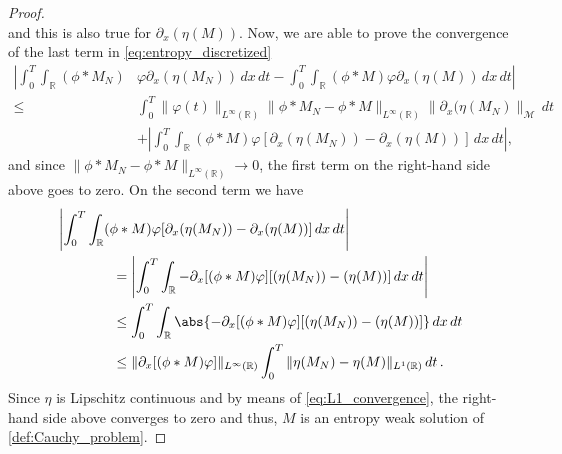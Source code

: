 \documentclass[11pt,a4paper,oneside]{amsart}
\def\green#1{\textcolor{green!70!black}{#1}}
\newcommand\R{\mathbb{R}}
\newcommand{\MM}{\mathcal{M}}
\begin{document}
\begin{proof}
$$        $$
        and this is also true for $\partial_x(\eta(M))$. Now, we are able to prove the convergence of the last term 
        in %
        \eqref{eq:entropy_discretized}%
        \begin{align*}
            \left|\int_0^T\int_\R(\phi\ast M_N)\right.&\left.\varphi\partial_x(\eta(M_N))\,dx\,dt-\int_0^T\int_\R (\phi\ast M)\varphi\partial_x(\eta(M))\,dx\,dt\right|\\
            \leq & \int_0^T \|\varphi(t)\|_{L^\infty(\R)}\|\phi\ast M_N-\phi\ast M\|_{L^\infty(\R)}\|\partial_x(\eta(M_N)\|_\MM\,dt \\
            &+\left| \int_0^T\int_\R (\phi\ast M)\varphi[\partial_x(\eta(M_N))-\partial_x(\eta(M))]\,dx\,dt\right|,
        \end{align*}
and since $\|\phi\ast M_N-\phi\ast M\|_{L^\infty(\R)}\to0$, the first term on the right-hand side above goes to zero.  
On the second term we have
        \begin{align*}
            &\left| \int_0^T\int_\R (\phi\ast M)\varphi[\partial_x(\eta(M_N))-\partial_x(\eta(M))]\,dx\,dt \right|\\
            &\qquad\qquad  = \left| \int_0^T\int_\R -\partial_x[(\phi\ast M)\varphi][(\eta(M_N))-(\eta(M))]\,dx\,dt \right|\\ 
            &\qquad\qquad  \leq \int_0^T\int_\R\abs{-\partial_x[(\phi\ast M)\varphi][(\eta(M_N))-(\eta(M))]}\,dx\,dt\\
            &\qquad\qquad  \leq \|\partial_x[(\phi\ast M)\varphi]\|_{L^\infty(\R)}\int_0^T\|\eta(M_N)-\eta(M)\|
            _{L^1(\R)}\,dt\,.
        \end{align*}
        Since $\eta$ is Lipschitz continuous and by means of \eqref{eq:L1_convergence}, the right-hand side above converges to zero and thus, 
        $M$ is an entropy weak solution of \eqref{def:Cauchy_problem}.
        

\end{proof}
\end{document}
